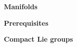 \documentclass[leqno]{article}
\begin{document}
\textbf{Manifolds} 

\textbf{Prerequisites}


\textbf{Compact Lie groups} 

\end{document}
